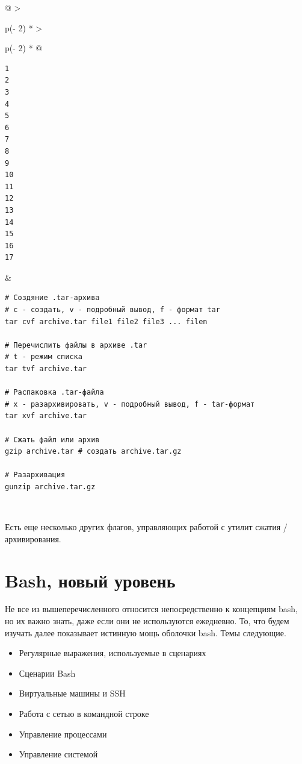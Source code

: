 \documentclass{article}
\begin{document}
\begin{longtable}[]{@{}
  >{\raggedright\arraybackslash}p{(\columnwidth - 2\tabcolsep) * }
  >{\raggedright\arraybackslash}p{(\columnwidth - 2\tabcolsep) * }@{}}
\toprule
\endhead
\begin{minipage}[t]{\linewidth}\raggedright
\begin{verbatim}
1
2
3
4
5
6
7
8
9
10
11
12
13
14
15
16
17
\end{verbatim}
\end{minipage} & \begin{minipage}[t]{\linewidth}\raggedright
\begin{verbatim}
# Создяние .tar-архива
# c - создать, v - подробный вывод, f - формат tar
tar cvf archive.tar file1 file2 file3 ... filen

# Перечислить файлы в архиве .tar
# t - режим списка
tar tvf archive.tar

# Распаковка .tar-файла
# x - разархивировать, v - подробный вывод, f - tar-формат
tar xvf archive.tar

# Сжать файл или архив
gzip archive.tar # создать archive.tar.gz

# Разархивация
gunzip archive.tar.gz
\end{verbatim}
\end{minipage} \\ \addlinespace
\bottomrule
\end{longtable}

Есть еще несколько других флагов, управляющих работой с утилит сжатия /
архивирования.

\hypertarget{Advanced-Bash}{%
\section{\texorpdfstring{\protect\hyperlink{Advanced-Bash}{}Bash, новый
уровень}{Bash, новый уровень}}\label{Advanced-Bash}}

Не все из вышеперечисленного относится непосредственно к концепциям
bash, но их важно знать, даже если они не используются ежедневно. То,
что будем изучать далее показывает истинную мощь оболочки bash. Темы
следующие.

\begin{itemize}
\tightlist
\item
  Регулярные выражения, используемые в сценариях
\item
  Сценарии Bash
\item
  Виртуальные машины и SSH
\item
  Работа с сетью в командной строке
\item
  Управление процессами
\item
  Управление системой
\end{itemize}
\end{document}
